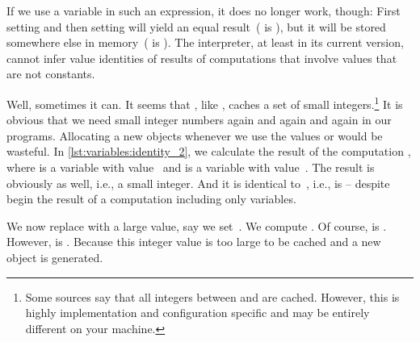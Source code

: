 If we use a variable in such an expression, it does no longer work, though:
First setting  and then setting  will yield an equal result~( is ), but it will be stored somewhere else in memory~( is ).
The interpreter, at least in its current version, cannot infer value identities of results of computations that involve values that are not constants.

Well, sometimes it can.
It seems that \python, like , caches a set of small integers.\footnote{%
Some sources say that all integers between  and  are cached. %
However, this is highly implementation and configuration specific and may be entirely different on your machine.%
}
It is obvious that we need small integer numbers again and again and again in our programs.
Allocating a new objects whenever we use the values  or  would be wasteful.
In \cref{lst:variables:identity_2}, we calculate the result of the computation , where  is a variable with value~ and  is a variable with value~.
The result is obviously  as well, i.e., a small integer.
And it is identical to~, i.e.,  is  -- despite begin the result of a computation including only variables.

We now replace  with a large value, say we set~.
We compute .
Of course,  is .
However,  is .
Because this integer value is too large to be cached and a new object is generated.%
%
\FloatBarrier%
\endhsection%
%
